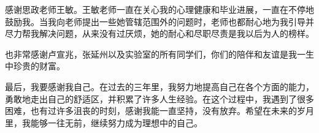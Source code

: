 \documentclass[UTF8,a4paper,12pt]{ctexart}
\numberwithin{equation}{section}
\begin{document}
	感谢思政老师王敏。王敏老师一直在关心我的心理健康和毕业进展，一直在不停地鼓励我。当我向老师提出一些她管辖范围外的问题时，老师也都耐心地为我引导并尽力帮我解决问题，从来没有过厌烦，她的耐心和尽职尽责是我以后为人的榜样。
	
	也非常感谢卢宣兆，张延州以及实验室的所有同学们，你们的陪伴和友谊是我一生中珍贵的财富。
	
	最后，我要感谢我自己。在过去的三年里，我努力地提高自己在各个方面的能力，勇敢地走出自己的舒适区，并积累了许多人生经验。在这个过程中，我遇到了很多困难，也有过许多沮丧的时刻，感谢我能一直坚持，没有放弃。希望在未来的岁月里，我能够一往无前，继续努力成为理想中的自己。
	
	
	
	
	
	
\end{document}
